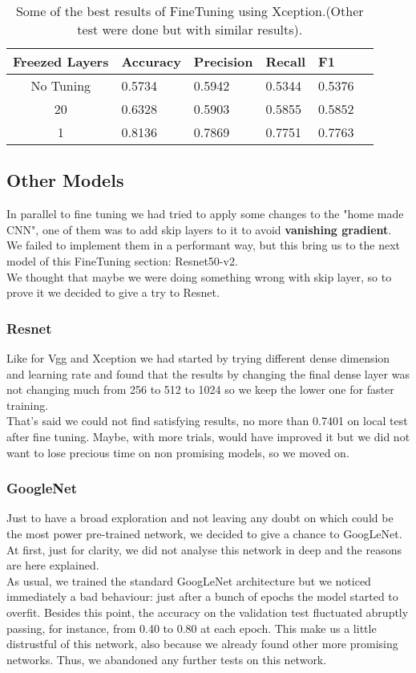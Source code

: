 \documentclass[10pt]{article}
\begin{document}
\begin{table}[ht]
  \centering
  \begin{adjustbox}{width=240}
  \small
  \begin{tabular}{|c|l|l|l|l|l}
  
  \hline \bf Freezed Layers & \bf Accuracy & \bf Precision & \bf Recall & \bf F1 \\ \hline
  No Tuning& 0.5734 & 0.5942 & 0.5344 & 0.5376\\
  20 & 0.6328 & 0.5903 & 0.5855 & 0.5852\\
  1 & 0.8136 & 0.7869 & 0.7751 & 0.7763\\
  \hline
  \end{tabular}
  \end{adjustbox}
  \caption{Some of the best results of FineTuning using Xception.(Other test were done but with similar results).}
  \end{table}
\subsection{Other Models}
In parallel to fine tuning we had tried to apply some changes to the "home made CNN", one of them was to add skip layers to it to avoid \textbf{vanishing gradient}.\\
We failed to implement them in a performant way, but this bring us to the next model of this FineTuning section: Resnet50-v2.\\
We thought that maybe we were doing something wrong with skip layer, so to prove it we decided to give a try to Resnet.
\subsubsection{Resnet}
Like for Vgg and Xception we had started by trying different dense dimension and learning rate and found that the results by changing the final dense layer was not changing much from 256 to 512 to 1024 so we keep the lower one for faster training.\\
That's said we could not find satisfying results, no more than 0.7401 on local test after fine tuning.
Maybe, with more trials, would have improved it but we did not want to lose precious time on non promising models, so we moved on.
\subsubsection{GoogleNet}
Just to have a broad exploration and not leaving any doubt on which could be the most power pre-trained network, we decided to give a chance to GoogLeNet. At first, just for clarity, we did not analyse this network in deep and the reasons are here explained.\\[0.1cm]
As usual, we trained the standard GoogLeNet architecture but we noticed immediately a bad behaviour: just after a bunch of epochs the model started to overfit. Besides this point, the accuracy on the validation test fluctuated abruptly passing, for instance, from 0.40 to 0.80 at each epoch. This make us a little distrustful of this network, also because we already found other more promising networks. Thus, we abandoned any further tests on this network.
\end{document}

